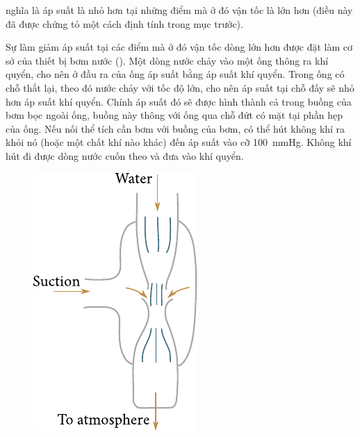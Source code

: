 \noindent

nghĩa là áp suất là nhỏ hơn tại những điểm mà ở đó vận tốc là lớn hơn (điều này đã được chứng tỏ một cách định tính trong mục trước).


Sự làm giảm áp suất tại các điểm mà ở đó vận tốc dòng lớn hơn được đặt làm cơ sở của thiết bị bơm nước (). Một dòng nước chảy vào một ống thông ra khí quyển, cho nên ở đầu ra của ống áp suất bằng áp suất khí quyển. Trong ống có chỗ thắt lại, theo đó nước chảy với tốc độ lớn, cho nên áp suất tại chỗ đấy sẽ nhỏ hơn áp suất khí quyển. Chính áp suất đó sẽ được hình thành cả trong buồng của bơm bọc ngoài ống, buồng này thông với ống qua chỗ đứt có mặt tại phần hẹp của ống. Nếu nối thể tích cần bơm với buồng của bơm, có thể hút không khí ra khỏi nó (hoặc một chất khí nào khác) đến áp suất vào cỡ \SI{100}{\mmHg}. Không khí hút đi được dòng nước cuốn theo và đưa vào khí quyển.

\begin{figure}[!htb]
	\begin{center}
		\includegraphics[scale=0.95]{figures/ch_09/fig_9_6.pdf}
		\caption[]{}
		\label{fig:9_6}
	\end{center}
	\vspace{-0.8cm}
\end{figure}

